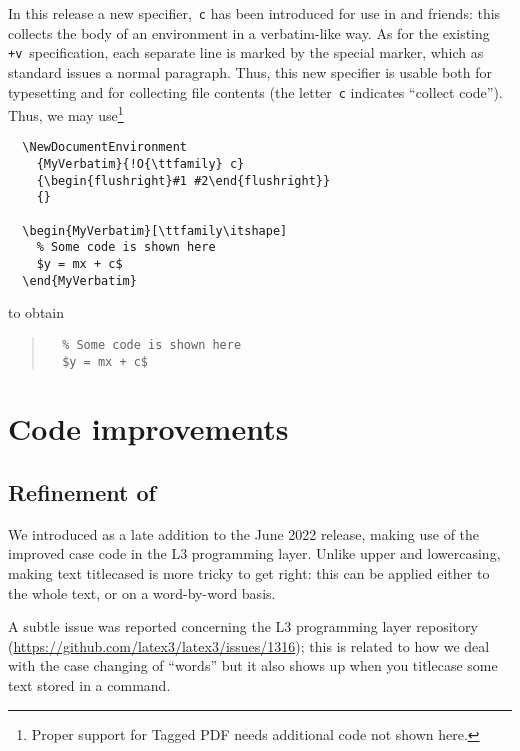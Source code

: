 \documentclass{ltnews}
\begin{document}
In this release a new specifier,~\texttt{c} has been introduced for
use in  and friends: this collects the body
of an environment in a verbatim-like way.  As for the existing
\texttt{+v}~specification, each separate line is marked by the special
 marker, which as standard issues a normal
paragraph. Thus, this new specifier is usable both for typesetting and
for collecting file contents (the letter~\texttt{c} indicates
\enquote{collect code}).  Thus, we may use\footnote{Proper support 
for Tagged PDF needs additional code not shown here.}
\begin{verbatim}
  \NewDocumentEnvironment
    {MyVerbatim}{!O{\ttfamily} c}
    {\begin{flushright}#1 #2\end{flushright}}
    {}
    
  \begin{MyVerbatim}[\ttfamily\itshape]
    % Some code is shown here
    $y = mx + c$
  \end{MyVerbatim}
\end{verbatim}
to obtain
\begin{quote}
\makeatletter
\def\@verbatim{%
  \trivlist
  \raggedleft
  \let \do \@makeother
  \dospecials
  \obeylines
  \normalfont \ttfamily \itshape
  \@noligs
}
\begin{verbatim}
  % Some code is shown here
  $y = mx + c$
\end{verbatim}
\end{quote}



\section{Code improvements}

\subsection{Refinement of }

We introduced  as a late addition to the June 2022
release, making use of the improved case code in the L3 programming
layer. Unlike upper and lowercasing, making text titlecased is more
tricky to get right: this can be applied either to the whole text, or
on a word-by-word basis.

A subtle issue was reported concerning the L3 programming layer
repository (\url{https://github.com/latex3/latex3/issues/1316}); this
is related to how we deal with the case changing of \enquote{words}
but it also shows up when you titlecase some text stored in a command.
\end{document}
